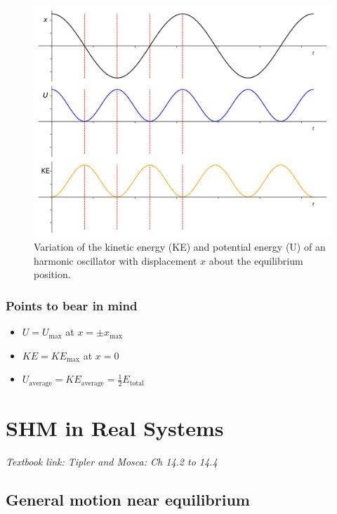 \documentclass[
]{book}
\providecommand{\tightlist}{%
  \setlength{\itemsep}{0pt}\setlength{\parskip}{0pt}}
\begin{document}
\begin{figure}

{\centering \includegraphics[width=0.7\linewidth]{visualisations/ch1-shmenergy} 

}

\caption{Variation of the kinetic energy (KE) and potential energy (U) of an harmonic oscillator with displacement $x$ about the equilibrium position. }\label{fig:ch1-energyinshm}
\end{figure}

\hypertarget{points-to-bear-in-mind}{%
\subsection{Points to bear in mind}\label{points-to-bear-in-mind}}

\begin{itemize}
\tightlist
\item
  \(U = U_\mathrm{max}\) at \(x = ±x_\mathrm{max}\)
\item
  \(KE = KE_\mathrm{max}\) at \(x = 0\)
\item
  \(U_\mathrm{average} = KE_\mathrm{average} = \frac{1}{2}E_\mathrm{total}\)
\end{itemize}

\hypertarget{sec:shm-real}{%
\chapter{SHM in Real Systems}\label{sec:shm-real}}

\emph{Textbook link: Tipler and Mosca: Ch 14.2 to 14.4}

\hypertarget{general-motion-near-equilibrium}{%
\section{General motion near equilibrium}\label{general-motion-near-equilibrium}}
\end{document}
